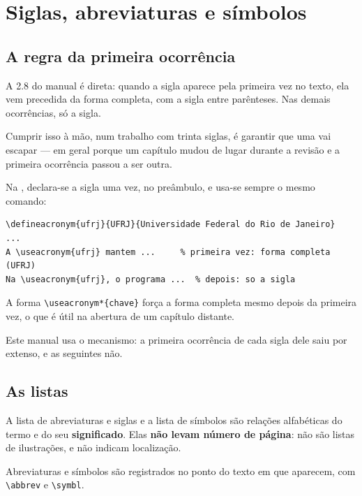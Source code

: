 \documentclass[dsc]{ufrj}
\begin{document}
  \nocite{*}

  \chapter{Siglas, abreviaturas e símbolos}

  \section{A regra da primeira ocorrência}

  A 2.8 do manual é direta: quando a sigla aparece pela primeira vez no texto,
  ela vem precedida da forma completa, com a sigla entre parênteses. Nas demais
  ocorrências, só a sigla.

  Cumprir isso à mão, num trabalho com trinta siglas, é garantir que uma vai
  escapar --- em geral porque um capítulo mudou de lugar durante a revisão e a
  primeira ocorrência passou a ser outra.

  Na \CoppeTeX, declara-se a sigla uma vez, no preâmbulo, e usa-se sempre o mesmo
  comando:

\begin{verbatim}
\defineacronym{ufrj}{UFRJ}{Universidade Federal do Rio de Janeiro}
...
A \useacronym{ufrj} mantem ...     % primeira vez: forma completa (UFRJ)
Na \useacronym{ufrj}, o programa ...  % depois: so a sigla
\end{verbatim}

  A forma \verb|\useacronym*{chave}| força a forma completa mesmo depois da primeira
  vez, o que é útil na abertura de um capítulo distante.

  Este manual usa o mecanismo: a primeira ocorrência de cada sigla dele saiu por
  extenso, e as seguintes não.

  \section{As listas}

  A lista de abreviaturas e siglas e a lista de símbolos são relações
  alfabéticas do termo e do seu \textbf{significado}. Elas \textbf{não levam
  número de página}: não são listas de ilustrações, e não indicam localização.

  Abreviaturas e símbolos são registrados no ponto do texto em que aparecem, com
  \verb|\abbrev| e \verb|\symbl|.

\end{document}
